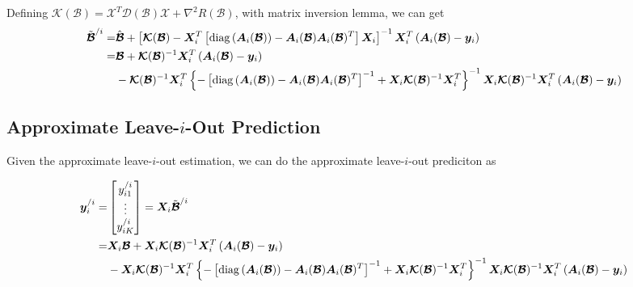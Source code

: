 \documentclass[letter]{article}
\begin{document}
	Defining $\bm{\mathcal{K}}(\bm{\mathcal{B}})=
	\bm{\mathcal{X}}^T
	\bm{\mathcal{D}}(\bm{\mathcal{B}})\bm{\mathcal{X}}+\nabla^2R(\bm{\mathcal{B}})$, with matrix inversion lemma, we can get
	$$\begin{aligned}
	\tilde{\bm{\mathcal{B}}}^{/i}
	=&\hat{\bm{\mathcal{B}}}+\left[\bm{\mathcal{K}}(\bm{\mathcal{B}})-\bm{X}_i^T\left[{\rm diag}\left(\bm{A}_i(\bm{\mathcal{B}})\right)-\bm{A}_i(\bm{\mathcal{B}})\bm{A}_i(\bm{\mathcal{B}})^T\right]\bm{X}_i\right]^{-1}\bm{X}_i^T\left(\bm{A}_i(\bm{\mathcal{B}})-\bm{y}_i\right) \\
	=&\bm{\mathcal{B}}+\bm{\mathcal{K}}(\bm{\mathcal{B}})^{-1}\bm{X}_i^T\left(\bm{A}_i(\bm{\mathcal{B}})-\bm{y}_i\right) \\
	&-
	\bm{\mathcal{K}}(\bm{\mathcal{B}})^{-1}\bm{X}_i^T\left\{-\left[{\rm diag}\left(\bm{A}_i(\bm{\mathcal{B}})\right)-\bm{A}_i(\bm{\mathcal{B}})\bm{A}_i(\bm{\mathcal{B}})^T\right]^{-1}+\bm{X}_i\bm{\mathcal{K}}(\bm{\mathcal{B}})^{-1}\bm{X}_i^T\right\}^{-1}\bm{X}_i\bm{\mathcal{K}}(\bm{\mathcal{B}})^{-1}\bm{X}_i^T\left(\bm{A}_i(\bm{\mathcal{B}})-\bm{y}_i\right)
	\end{aligned}$$
	
	\subsection{Approximate Leave-$i$-Out Prediction}
	
	Given the approximate leave-$i$-out estimation, we can do the approximate leave-$i$-out prediciton as 
	
	$$\begin{aligned}
	\bm{y}_{i}^{/i}=&
	\begin{bmatrix}
	y_{i1}^{/i} \\
	\vdots \\
	y_{iK}^{/i} \\
	\end{bmatrix}=
	\bm{X}_i\tilde{\bm{\mathcal{B}}}^{/i} \\
	=&\bm{X}_i\bm{\mathcal{B}}+\bm{X}_i\bm{\mathcal{K}}(\bm{\mathcal{B}})^{-1}\bm{X}_i^T\left(\bm{A}_i(\bm{\mathcal{B}})-\bm{y}_i\right)\\
	&-\bm{X}_i
	\bm{\mathcal{K}}(\bm{\mathcal{B}})^{-1}\bm{X}_i^T\left\{-\left[{\rm diag}\left(\bm{A}_i(\bm{\mathcal{B}})\right)-\bm{A}_i(\bm{\mathcal{B}})\bm{A}_i(\bm{\mathcal{B}})^T\right]^{-1}+\bm{X}_i\bm{\mathcal{K}}(\bm{\mathcal{B}})^{-1}\bm{X}_i^T\right\}^{-1}\bm{X}_i\bm{\mathcal{K}}(\bm{\mathcal{B}})^{-1}\bm{X}_i^T\left(\bm{A}_i(\bm{\mathcal{B}})-\bm{y}_i\right) \\
	\end{aligned}$$
	
\end{document}
